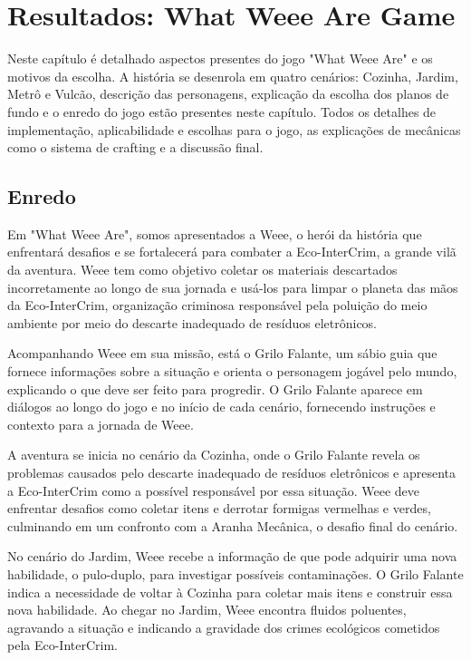 \chapter{Resultados: What Weee Are Game}
\label{resultados}

Neste capítulo é detalhado aspectos presentes do jogo "What Weee Are" e os motivos da escolha. A história se desenrola em quatro cenários: Cozinha, Jardim, Metrô e Vulcão, descrição das personagens, explicação da escolha dos planos de fundo e o enredo do jogo estão presentes neste capítulo. Todos os detalhes de implementação, aplicabilidade e escolhas para o jogo, as explicações de mecânicas como o sistema de crafting e a discussão final.

\section{Enredo}
Em "What Weee Are", somos apresentados a Weee, o herói da história que enfrentará desafios e se fortalecerá para combater a Eco-InterCrim, a grande vilã da aventura. Weee tem como objetivo coletar os materiais descartados incorretamente ao longo de sua jornada e usá-los para limpar o planeta das mãos da Eco-InterCrim, organização criminosa responsável pela poluição do meio ambiente por meio do descarte inadequado de resíduos eletrônicos.

Acompanhando Weee em sua missão, está o Grilo Falante, um sábio guia que fornece informações sobre a situação e orienta o personagem jogável pelo mundo, explicando o que deve ser feito para progredir. O Grilo Falante aparece em diálogos ao longo do jogo e no início de cada cenário, fornecendo instruções e contexto para a jornada de Weee.

A aventura se inicia no cenário da Cozinha, onde o Grilo Falante revela os problemas causados pelo descarte inadequado de resíduos eletrônicos e apresenta a Eco-InterCrim como a possível responsável por essa situação. Weee deve enfrentar desafios como coletar itens e derrotar formigas vermelhas e verdes, culminando em um confronto com a Aranha Mecânica, o desafio final do cenário.

No cenário do Jardim, Weee recebe a informação de que pode adquirir uma nova habilidade, o pulo-duplo, para investigar possíveis contaminações. O Grilo Falante indica a necessidade de voltar à Cozinha para coletar mais itens e construir essa nova habilidade. Ao chegar no Jardim, Weee encontra fluidos poluentes, agravando a situação e indicando a gravidade dos crimes ecológicos cometidos pela Eco-InterCrim.


